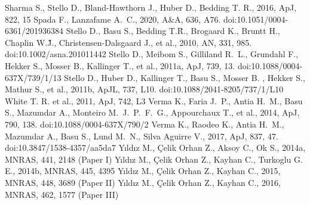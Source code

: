 \documentclass[a4paper,fleqn,usenatbib]{mnras}     %
\begin{document}
{\begin{thebibliography}{99}
 Sharma S., Stello D., Bland-Hawthorn J., Huber D., Bedding T. R., 2016,
ApJ, 822, 15
 Spada F., Lanzafame A.~C., 2020, A\&A, 636, A76. doi:10.1051/0004-6361/201936384
 Stello D., Basu S., Bedding T.\~R., Brogaard K., Bruntt H., Chaplin W.\~J., Christensen-Dalsgaard J., et al., 2010, AN, 331, 985. doi:10.1002/asna.201011442
 Stello D., Meibom S., Gilliland R.~L., Grundahl F., Hekker S., Mosser B., Kallinger T., et al., 2011a, ApJ, 739, 13. doi:10.1088/0004-637X/739/1/13
 Stello D., Huber D., Kallinger T., Basu S., Mosser B.
, Hekker S., Mathur S., et al., 2011b, ApJL, 737, L10. doi:10.1088/2041-8205/737/1/L10
 White T. R. et al., 2011, ApJ, 742, L3
 Verma K., Faria J.~P., Antia H.~M., Basu S., Mazumdar A., Monteiro M.~J.~P.~F.~G., Appourchaux T., et al., 2014, ApJ, 790, 138. doi:10.1088/0004-637X/790/2
 Verma K., Raodeo K., Antia H.~M., Mazumdar A., Basu S., Lund M.~N., Silva Aguirre V., 2017, ApJ, 837, 47. doi:10.3847/1538-4357/aa5da7
 Y{\i}ld{\i}z M.,  \c{C}elik Orhan Z., Aksoy  C., Ok S., 2014a, MNRAS, 441, 2148 (Paper I)
 Y{\i}ld{\i}z M.,  \c{C}elik Orhan Z., Kayhan  C., Turkoglu G. E., 2014b, MNRAS, 445, 4395
 Y{\i}ld{\i}z M.,  \c{C}elik Orhan Z., Kayhan C., 2015, MNRAS, 448, 3689 (Paper II)
 Y{\i}ld{\i}z M.,  \c{C}elik Orhan Z., Kayhan C., 2016, MNRAS, 462, 1577 (Paper III)



\end{thebibliography}}
\end{document}
